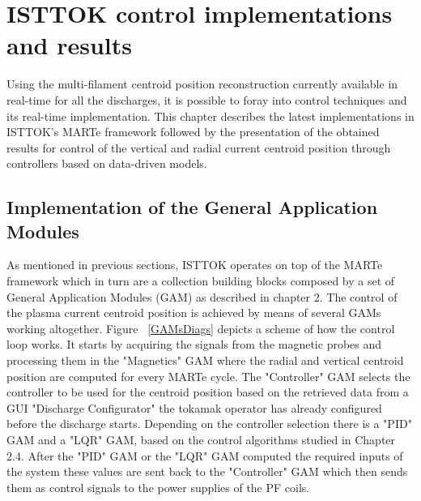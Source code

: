 \chapter{ISTTOK control implementations and results }

Using the multi-filament centroid position reconstruction currently available in real-time for all the discharges, it is possible to foray into control techniques and its real-time implementation. This chapter describes the latest implementations in ISTTOK's  MARTe framework followed by the presentation of the obtained results for control of the vertical and radial current centroid position through  controllers based on data-driven models.

\section{Implementation of the General Application Modules }

As mentioned in previous sections, ISTTOK operates on top of the MARTe framework which in turn are a collection building blocks composed by a set of General Application Modules (GAM) as described in chapter 2. The control of the plasma current centroid position is achieved by means of several GAMs working altogether.  Figure ~\ref{GAMsDiags} depicts a scheme of how the control loop works. It starts by acquiring  the signals from the magnetic probes and processing them in the "Magnetics" GAM where the radial and vertical centroid position are computed for every MARTe cycle. The "Controller" GAM selects the controller to be used for the centroid position based on the retrieved data from a GUI "Discharge Configurator" the tokamak operator has already configured before the discharge starts. Depending on the controller selection there is a "PID" GAM and a "LQR" GAM, based on the control algorithms studied in Chapter 2.4. After the "PID" GAM or the "LQR" GAM computed the required  inputs of the system these values are sent back to the "Controller" GAM which then sends them as control signals to the power supplies of the PF coils.\smallskip


